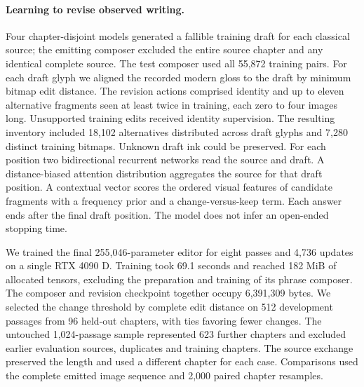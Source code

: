 \paragraph{Learning to revise observed writing.}
Four chapter-disjoint models generated a fallible training draft for each classical source; the emitting composer excluded the entire source chapter and any identical complete source. The test composer used all 55,872 training pairs. For each draft glyph we aligned the recorded modern gloss to the draft by minimum bitmap edit distance. The revision actions comprised identity and up to eleven alternative fragments seen at least twice in training, each zero to four images long. Unsupported training edits received identity supervision. The resulting inventory included 18,102 alternatives distributed across draft glyphs and 7,280 distinct training bitmaps. Unknown draft ink could be preserved. For each position two bidirectional recurrent networks read the source and draft. A distance-biased attention distribution aggregates the source for that draft position. A contextual vector scores the ordered visual features of candidate fragments with a frequency prior and a change-versus-keep term. Each answer ends after the final draft position. The model does not infer an open-ended stopping time.

We trained the final 255,046-parameter editor for eight passes and 4,736 updates on a single RTX 4090 D. Training took 69.1 seconds and reached 182 MiB of allocated tensors, excluding the preparation and training of its phrase composer. The composer and revision checkpoint together occupy 6,391,309 bytes. We selected the change threshold by complete edit distance on 512 development passages from 96 held-out chapters, with ties favoring fewer changes. The untouched 1,024-passage sample represented 623 further chapters and excluded earlier evaluation sources, duplicates and training chapters. The source exchange preserved the length and used a different chapter for each case. Comparisons used the complete emitted image sequence and 2,000 paired chapter resamples.

